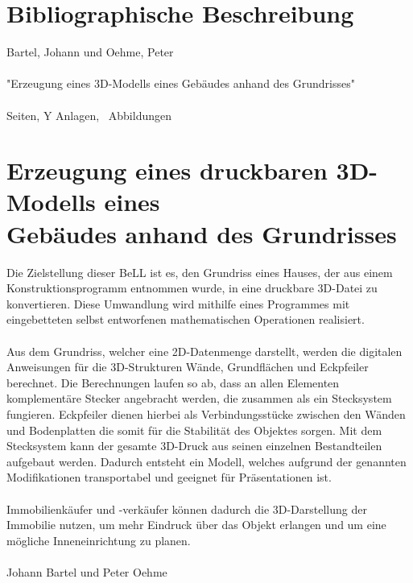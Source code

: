 \section*{Bibliographische Beschreibung}
Bartel, Johann und Oehme, Peter\\\\
"Erzeugung eines 3D-Modells eines Gebäudes anhand des Grundrisses"\\\\
 \pageref{LastPage} Seiten, Y Anlagen, \totalfigures\ Abbildungen
 
  \newpage
 
\section*{Erzeugung eines druckbaren 3D-Modells eines \\ Gebäudes anhand des Grundrisses}
 	
 
 Die Zielstellung dieser BeLL ist es, den Grundriss eines Hauses, der aus einem Konstruktionsprogramm entnommen wurde, in eine druckbare 3D-Datei zu konvertieren.
 Diese Umwandlung wird mithilfe eines Programmes mit eingebetteten selbst entworfenen mathematischen Operationen realisiert.\\\\
 Aus dem Grundriss, welcher eine 2D-Datenmenge darstellt, werden die digitalen Anweisungen für die 3D-Strukturen Wände, Grundflächen und Eckpfeiler berechnet. 
 Die Berechnungen laufen so ab, dass an allen Elementen komplementäre Stecker angebracht werden, die zusammen als ein Stecksystem fungieren. 
 Eckpfeiler dienen hierbei als Verbindungsstücke zwischen den Wänden und Bodenplatten die somit für die Stabilität des Objektes  sorgen. 
 Mit dem Stecksystem kann der gesamte 3D-Druck aus seinen einzelnen Bestandteilen aufgebaut werden. 
 Dadurch entsteht ein Modell, welches aufgrund der genannten Modifikationen transportabel und geeignet für Präsentationen ist.\\\\
 Immobilienkäufer und -verkäufer können dadurch die 3D-Darstellung der Immobilie  nutzen, um mehr Eindruck über das Objekt erlangen und um eine mögliche Inneneinrichtung zu planen.\\\\
 Johann Bartel und Peter Oehme
